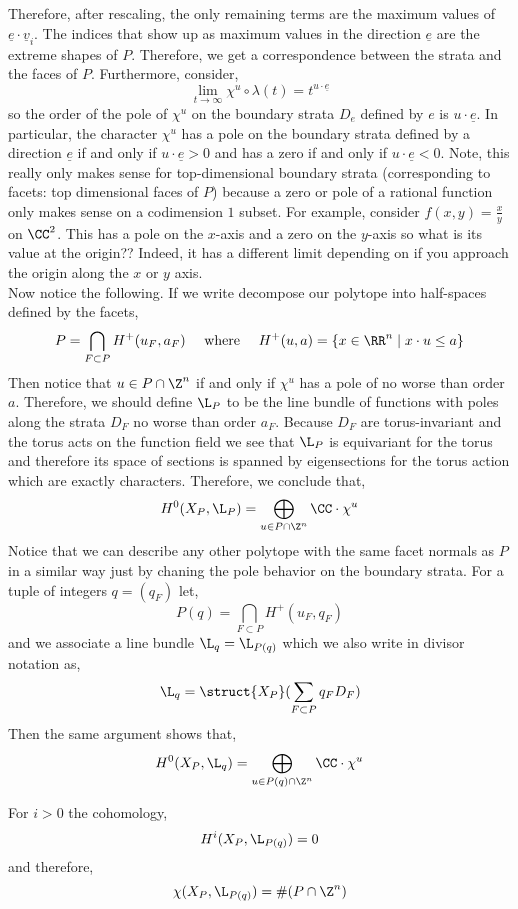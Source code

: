 \documentclass[12pt]{article}
\begin{document}
Therefore, after rescaling, the only remaining terms are the maximum values of $\underline{e} \cdot \underline{v}_i$. The indices that show up as maximum values in the direction $\underline{e}$ are the extreme shapes of $P$. Therefore, we get a correspondence between the strata and the faces of $P$. Furthermore, consider,
\[ \lim_{t \to \infty} \chi^u \circ \lambda(t) = t^{u \cdot \underline{e}} \]
so the order of the pole of $\chi^u$ on the boundary strata $D_e$ defined by $e$ is $u \cdot \underline{e}$. In particular, the character $\chi^u$ has a pole on the boundary strata defined by a direction $\underline{e}$ if and only if $u \cdot \underline{e} > 0$ and has a zero if and only if $u \cdot \underline{e} < 0$. Note, this really only makes sense for top-dimensional boundary strata (corresponding to facets: top dimensional faces of $P$) because a zero or pole of a rational function only makes sense on a codimension $1$ subset. For example, consider $f(x,y) = \frac{x}{y}$ on $\CC^2$. This has a pole on the $x$-axis and a zero on the $y$-axis so what is its value at the origin?? Indeed, it has a different limit depending on if you approach the origin along the $x$ or $y$ axis. 
\bigskip\\
Now notice the following. If we write decompose our polytope into half-spaces defined by the facets,
\[ P = \bigcap_{F \subset P} H^+(u_F, a_F) \quad \text{ where } \quad H^+(u, a) = \{ x \in \RR^n \mid x \cdot u \le a \} \]
Then notice that $u \in P \cap \Z^n$ if and only if $\chi^u$ has a pole of no worse than order $a$. Therefore, we should define $\L_P$ to be the line bundle of functions with poles along the strata $D_F$ no worse than order $a_F$. Because $D_F$ are torus-invariant and the torus acts on the function field we see that $\L_P$ is equivariant for the torus and therefore its space of sections is spanned by eigensections for the torus action which are exactly characters. Therefore, we conclude that,
\[ H^0(X_P, \L_P) = \bigoplus_{u \in P \cap \Z^n} \CC \cdot \chi^u \]
Notice that we can describe any other polytope with the same facet normals as $P$ in a similar way just by chaning the pole behavior on the boundary strata. For a tuple of integers $q = (q_F)$ let,
\[ P(q) = \bigcap_{F \subset P} H^+(u_F, q_F) \]
and we associate a line bundle $\L_q = \L_{P(q)}$ which we also write in divisor notation as,
\[ \L_q = \struct{X_P}(\sum_{F \subset P} q_F D_F) \]
Then the same argument shows that,
\[ H^0(X_P, \L_q) = \bigoplus_{u \in P(q) \cap \Z^n} \CC \cdot \chi^u \]

\begin{thm}[Demazure]
For $i > 0$ the cohomology,
\[ H^i(X_P, \L_{P(q)}) = 0 \]
and therefore,
\[ \chi(X_P, \L_{P(q)}) = \# (P \cap \Z^n) \]
\end{thm}
\end{document}
